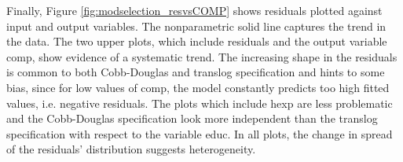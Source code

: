 \documentclass[12pt,a4paper]{article}\usepackage[]{graphicx}\usepackage[]{color}
\begin{document}
Finally, Figure \ref{fig:modselection_resvsCOMP} shows residuals plotted against input and output variables. The nonparametric solid line captures the trend in the data. The two upper plots, which include residuals and the output variable comp, show evidence of a systematic trend. The increasing shape in the residuals is common to both Cobb-Douglas and translog specification and hints to some bias, since for low values of comp, the model constantly predicts too high fitted values, i.e. negative residuals. The plots which include hexp are less problematic and the Cobb-Douglas specification look more independent than the translog specification with respect to the variable educ. In all plots, the change in spread of the residuals' distribution suggests heterogeneity.

\end{document}
